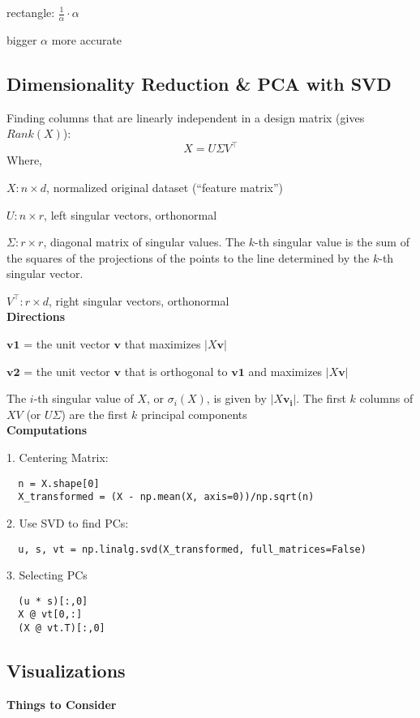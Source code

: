 \documentclass[8pt]{extarticle}
\begin{document}
rectangle: $ \frac{1}{\alpha} \cdot \alpha $

bigger $\alpha$ more accurate

\subsection*{Dimensionality Reduction \& PCA with SVD}
Finding columns that are linearly independent in a design matrix (gives $Rank(X)$):
$$ X = U\Sigma V^\top $$
Where,

$X: n\times d$, normalized original dataset (“feature matrix”)

$U: n\times r$, left singular vectors, orthonormal

$\Sigma: r\times r$, diagonal matrix of singular values. The $k$-th singular value is the sum of the squares of the projections of the points to the line determined by the $k$-th singular vector.

$V^\top: r\times d$, right singular vectors, orthonormal\\

\textbf{Directions}

$\mathbf{v1}$ = the unit vector $\mathbf{v}$ that maximizes $|X\mathbf{v}|$

$\mathbf{v2}$ = the unit vector $\mathbf{v}$ that is orthogonal to $\mathbf{v1}$ and maximizes $|X\mathbf{v}|$

The $i$-th singular value of $X$, or $\sigma_i(X)$, is given by $|X\mathbf{v_i}|$. The first $k$ columns of $XV$ (or $UΣ$) are the first $k$ principal components\\

\textbf{Computations}

1. Centering Matrix:
\begin{verbatim}
  n = X.shape[0]
  X_transformed = (X - np.mean(X, axis=0))/np.sqrt(n)
\end{verbatim}

2. Use SVD to find PCs:
\begin{verbatim}
  u, s, vt = np.linalg.svd(X_transformed, full_matrices=False)
\end{verbatim}

3. Selecting PCs
\begin{verbatim}
  (u * s)[:,0] 
  X @ vt[0,:] 
  (X @ vt.T)[:,0]
\end{verbatim}
\hline

\subsection*{Visualizations}
\textbf{Things to Consider}
\end{document}

